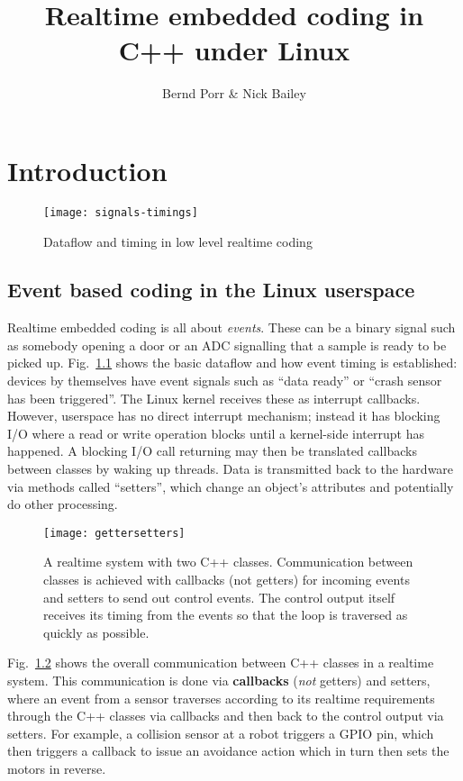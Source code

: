 \documentclass[12pt]{report}
\author{Bernd Porr \& Nick Bailey}
\title{Realtime embedded coding in C++ under Linux}
\begin{document}
\maketitle

\tableofcontents

\chapter{Introduction}



\begin{figure}[!hbt]
\begin{center}
\mbox{\texttt{[image: signals-timings]}}
\end{center}
\caption{Dataflow and timing in low level realtime coding
\label{timing}}
\end{figure}

\section{Event based coding in the Linux userspace}

Realtime embedded coding is all about \textsl{events}.
These can be a binary signal such as somebody opening a door or
an ADC signalling that a sample is ready to be picked up.
Fig.~\ref{timing} shows the basic dataflow and how event timing is
established: devices by themselves have event signals such as ``data
ready'' or ``crash sensor has been triggered''. The Linux kernel receives
these as interrupt callbacks. However, userspace has no direct interrupt
mechanism; instead it has blocking I/O where a read or write operation blocks
until a kernel-side interrupt has happened. A blocking I/O call returning
may then be translated callbacks between classes by waking up threads.
Data is transmitted back to the hardware via methods called ``setters'',
which change an object's attributes and potentially do other processing.

\begin{figure}[!hbt]
\begin{center}
\mbox{\texttt{[image: gettersetters]}}
\end{center}
\caption{A realtime system with two C++ classes. Communication
  between classes is achieved with callbacks (not getters) for incoming events
  and setters to send out control events. The control output itself
  receives its timing from the events so that the loop is traversed
  as quickly as possible.
\label{gettersetters}}
\end{figure}
Fig.~\ref{gettersetters} shows the overall communication between C++
classes in a realtime system. This communication is done via \textbf{callbacks}
(\textsl{not} getters) and setters, where an event from a sensor
traverses according to its realtime requirements through the C++ classes via
callbacks and then back to the control output via setters. For example,
a collision sensor at a robot triggers a GPIO pin, which then triggers a
callback to issue an avoidance action which in turn then sets the
motors in reverse.
\end{document}
